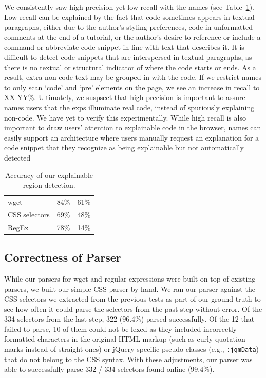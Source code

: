 \begin{changes}
We consistently saw high precision yet low recall with the \glspl{name} (see Table~\ref{tab:detection_accuracy}).    
Low recall can be explained by the fact that code sometimes appears in textual paragraphs, either due to the author's styling preferences, code in unformatted comments at the end of a tutorial, or the author's desire to reference or include a command or abbreviate code snippet in-line with text that describes it.
It is difficult to detect code snippets that are interspersed in textual paragraphs, as there is no textual or structural indicator of where the code starts or ends.
As a result, extra non-code text may be grouped in with the code.
If we restrict \glspl{name} to only scan `code' and `pre' elements on the page, we see an increase in recall to XX-YY\%.
Ultimately, we suspsect that high precision is important to assure \glspl{name} users that the \glspl{exp} illuminate real code, instead of spuriously explaining non-code.
We have yet to verify this experimentally.
While high recall is also important to draw users' attention to explainable code in the browser, \glspl{name} can easily support an architecture where users manually request an explanation for a code snippet that they recognize as being explainable but not automatically detected
\end{changes}
%
\begin{table}
\caption{Accuracy of our explainable region detection.}
\label{tab:detection_accuracy}
\centering
\begin{tabular}{llc}
\toprule
\headrow{Language} & \headrow{Precision} & \headrow{Recall} \\
\midrule
wget & 84\% & 61\% \\ \midrule
CSS selectors & 69\% & 48\% \\ \midrule
RegEx & 78\% & 14\% \\ \bottomrule
\end{tabular}
\end{table}
\fi
%
\begin{changes}
\subsection{Correctness of Parser}

While our parsers for wget and regular expressions were built on top of existing parsers, we built our simple CSS parser by hand.
We ran our parser against the CSS selectors we extracted from the previous tests as part of our ground truth to see how often it could parse the selectors from the past step without error.
Of the 334 selectors from the last step, 322 (96.4\%) parsed successfully.
Of the 12 that failed to parse, 10 of them could not be lexed as they included incorrectly-formatted characters in the original HTML markup (such as curly quotation marks instead of straight ones) or jQuery-specific pseudo-classes (e.g., \texttt{:jqmData}) that do not belong to the CSS syntax.
With these adjustments, our parser was able to successfully parse 332 / 334 selectors found online (99.4\%).

\end{changes}

